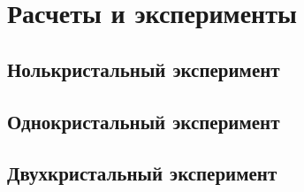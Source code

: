\section{Расчеты и эксперименты}
\subsection{Нолькристальный эксперимент}
\subsection{Однокристальный эксперимент}
\subsection{Двухкристальный эксперимент}


  
  
  
